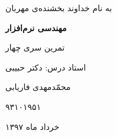 \begin{center}
\large
به نام خداوند بخشنده‌ی مهربان

\Huge
\vspace*{4cm}
\textbf{مهندسی نرم‌افزار}

\vspace*{1cm}
\large
تمرین سری چهار
\vspace*{3cm}

\Large
استاد درس: دکتر حبیبی
\vspace*{2cm}

\vspace*{1cm}

 محمّدمهدی فاریابی
 
۹۳۱۰۱۹۵۱
\vspace*{3cm}
\large

خرداد ماه ۱۳۹۷
\vspace*{5cm}

\end{center}
\newpage


